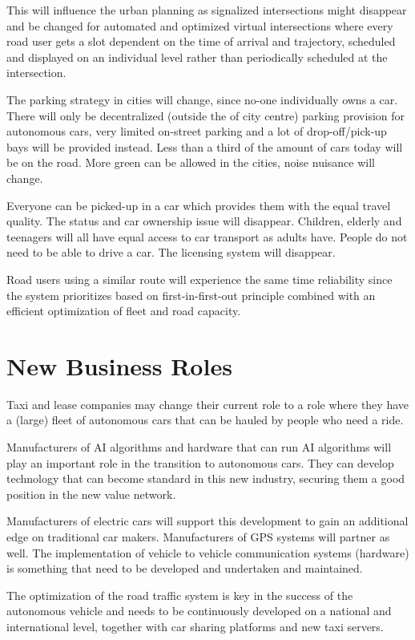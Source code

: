 \documentclass[a4paper]{article}
\begin{document}
This will influence the urban planning as signalized intersections might disappear and be changed for automated and optimized virtual intersections where every road user gets a slot dependent on the time of arrival and trajectory, scheduled and displayed on an individual level rather than periodically scheduled at the intersection.

The parking strategy in cities will change, since no-one individually owns a car. There will only be decentralized (outside the of city centre) parking provision for autonomous cars, very limited on-street parking and a lot of drop-off/pick-up bays will be provided instead. Less than a third of the amount of cars today will be on the road. More green can be allowed in the cities, noise nuisance will change.

Everyone can be picked-up in a car which provides them with the equal travel quality. The status and car ownership issue will disappear. Children, elderly and teenagers will all have equal access to car transport as adults have. People do not need to be able to drive a car. The licensing system will disappear.

Road users using a similar route will experience the same time reliability since the system prioritizes based on first-in-first-out principle combined with an efficient optimization of fleet and road capacity.

\section{New Business Roles}
\label{sec:new-business-roles}

Taxi and lease companies may change their current role to a role where they have a (large) fleet of autonomous cars that can be hauled by people who need a ride.

Manufacturers of AI algorithms and hardware that can run AI algorithms will play an important role in the transition to autonomous cars. They can develop technology that can become standard in this new industry, securing them a good position in the new value network.

Manufacturers of electric cars will support this development to gain an additional edge on traditional car makers.
Manufacturers of GPS systems will partner as well. The implementation of vehicle to vehicle communication systems (hardware) is something that need to be developed and undertaken and maintained. 

The optimization of the road traffic system is key in the success of the autonomous vehicle and needs to be continuously developed on a national and international level, together with car sharing platforms and new taxi servers.  
\end{document}
